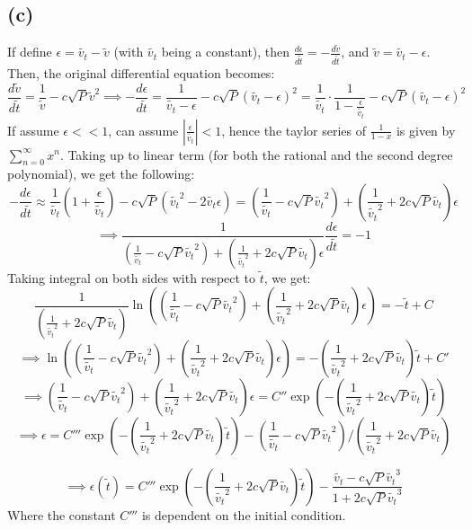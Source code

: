 \documentclass{article}
\begin{document}
\subsection*{(c)}
If define $\epsilon=\tilde{v_t}-\tilde{v}$ (with $\tilde{v_t}$ being a constant), then $\frac{d\epsilon}{d\tilde{t}} = - \frac{d\tilde{v}}{d\tilde{t}}$, and $\tilde{v}=\tilde{v_t}-\epsilon$. Then, the original differential equation becomes:
$$\frac{d\tilde{v}}{d\tilde{t}}=\frac{1}{\tilde{v}}-c\sqrt{P}\tilde{v}^2 \implies -\frac{d\epsilon}{d\tilde{t}} = \frac{1}{\tilde{v_t}-\epsilon}-c\sqrt{P}(\tilde{v_t}-\epsilon)^2 = \frac{1}{\tilde{v_t}}\cdot \frac{1}{1-\frac{\epsilon}{\tilde{v_t}}}-c\sqrt{P}(\tilde{v_t}-\epsilon)^2$$
If assume $\epsilon<<1$, can assume $|\frac{\epsilon}{\tilde{v_t}}|<1$, hence the taylor series of $\frac{1}{1-x}$ is given by $\sum_{n=0}^{\infty}x^n$. Taking up to linear term (for both the rational and the second degree polynomial), we get the following:
$$-\frac{d\epsilon}{d\tilde{t}}\approx \frac{1}{\tilde{v_t}}\left(1+\frac{\epsilon}{\tilde{v_t}}\right)-c\sqrt{P}(\tilde{v_t}^2-2\tilde{v_t}\epsilon) = \left(\frac{1}{\tilde{v_t}}-c\sqrt{P}\tilde{v_t}^2\right)+\left(\frac{1}{\tilde{v_t}^2}+2c\sqrt{P}\tilde{v_t}\right)\epsilon$$
$$\implies \frac{1}{\left(\frac{1}{\tilde{v_t}}-c\sqrt{P}\tilde{v_t}^2\right)+\left(\frac{1}{\tilde{v_t}^2}+2c\sqrt{P}\tilde{v_t}\right)\epsilon}\frac{d\epsilon}{d\tilde{t}} = -1$$
Taking integral on both sides with respect to $\tilde{t}$, we get:
$$\frac{1}{\left(\frac{1}{\tilde{v_t}^2}+2c\sqrt{P}\tilde{v_t}\right)}\ln\left(\left(\frac{1}{\tilde{v_t}}-c\sqrt{P}\tilde{v_t}^2\right)+\left(\frac{1}{\tilde{v_t}^2}+2c\sqrt{P}\tilde{v_t}\right)\epsilon\right) = -\tilde{t}+C$$
$$\implies\ln\left(\left(\frac{1}{\tilde{v_t}}-c\sqrt{P}\tilde{v_t}^2\right)+\left(\frac{1}{\tilde{v_t}^2}+2c\sqrt{P}\tilde{v_t}\right)\epsilon\right)=-\left(\frac{1}{\tilde{v_t}^2}+2c\sqrt{P}\tilde{v_t}\right)\tilde{t}+C'$$
$$\implies \left(\frac{1}{\tilde{v_t}}-c\sqrt{P}\tilde{v_t}^2\right)+\left(\frac{1}{\tilde{v_t}^2}+2c\sqrt{P}\tilde{v_t}\right)\epsilon = C''\exp\left(-\left(\frac{1}{\tilde{v_t}^2}+2c\sqrt{P}\tilde{v_t}\right)\tilde{t}\right)$$
$$\implies \epsilon = C'''\exp\left(-\left(\frac{1}{\tilde{v_t}^2}+2c\sqrt{P}\tilde{v_t}\right)\tilde{t}\right)-\left(\frac{1}{\tilde{v_t}}-c\sqrt{P}\tilde{v_t}^2\right)/\left(\frac{1}{\tilde{v_t}^2}+2c\sqrt{P}\tilde{v_t}\right)$$

$$\implies \epsilon(\tilde{t}) = C'''\exp\left(-\left(\frac{1}{\tilde{v_t}^2}+2c\sqrt{P}\tilde{v_t}\right)\tilde{t}\right)-\frac{\tilde{v_t}-c\sqrt{P}\tilde{v_t}^3}{1+2c\sqrt{P}\tilde{v_t}^3}$$
Where the constant $C'''$ is dependent on the initial condition.
\end{document}
